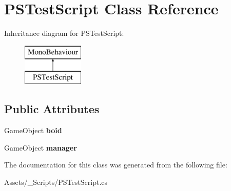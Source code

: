 \hypertarget{class_p_s_test_script}{}\section{P\+S\+Test\+Script Class Reference}
\label{class_p_s_test_script}
Inheritance diagram for P\+S\+Test\+Script\+:\begin{figure}[H]
\begin{center}
\leavevmode
\includegraphics[height=2.000000cm]{class_p_s_test_script}
\end{center}
\end{figure}
\subsection*{Public Attributes}
\begin{DoxyCompactItemize}
\item 
\mbox{\label{class_p_s_test_script_ab97ba85a76aedd01cbfc3060a8cd517d}} 
Game\+Object {\bfseries boid}
\item 
\mbox{\label{class_p_s_test_script_a63989908430204f09fba07c560b77bd5}} 
Game\+Object {\bfseries manager}
\end{DoxyCompactItemize}


The documentation for this class was generated from the following file\+:\begin{DoxyCompactItemize}
\item 
Assets/\+\_\+\+Scripts/P\+S\+Test\+Script.\+cs\end{DoxyCompactItemize}
